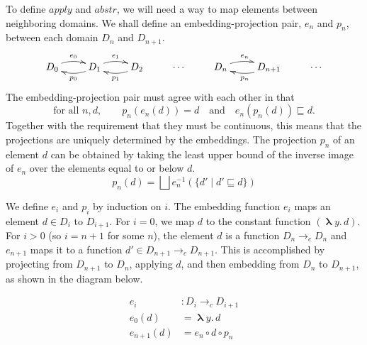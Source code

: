 \documentclass{tufte-handout}
\newcommand{\MLAM}[1]{\boldsymbol\uplambda #1.\,}
\begin{document}
To define $\mathit{apply}$ and $\mathit{abstr}$, we will need a way to
map elements between neighboring domains. We shall define an
embedding-projection pair, $e_n$ and $p_n$, between each domain $D_n$
and $D_{n+1}$.
\[
\xymatrix{
  D_0 \ar@/^/[r]^{e_0} & D_1 \ar@/^/[l]^{p_0} \ar@/^/[r]^{e_1} 
      & D_2 \ar@/^/[l]^{p_1} & \cdots &
  D_n \ar@/^/[r]^{e_n} & D_{n+1} \ar@/^/[l]^{p_n} & \cdots
}
\]
The embedding-projection pair must agree with each other in
that
\[
\text{for all } n, d, \qquad 
p_n(e_n(d)) = d \quad\text{and}\quad
e_n(p_n(d)) \sqsubseteq d.
\]
Together with the requirement that they must be continuous, this means
that the projections are uniquely determined by the embeddings.  The
projection $p_n$ of an element $d$ can be obtained by taking the least
upper bound of the inverse image of $e_n$ over the elements equal to
or below $d$.
\begin{equation}
   p_n(d) = \bigsqcup e^{-1}_n(\{ d' \mid d' \sqsubseteq d \})
   \label{eq:pn}
\end{equation}

We define $e_i$ and $p_i$ by induction on $i$. The embedding function
$e_i$ maps an element $d \in D_i$ to $D_{i+1}$.  For $i=0$, we map $d$
to the constant function $(\MLAM{y}d)$.  For $i > 0$ (so $i=n+1$ for
some $n$), the element $d$ is a function $D_n \to_c D_n$ and $e_{n+1}$
maps it to a function $d' \in D_{n+1} \to_c D_{n+1}$. This is
accomplished by projecting from $D_{n+1}$ to $D_n$, applying $d$, and
then embedding from $D_n$ to $D_{n+1}$, as shown in the diagram below.
\begin{center}
\begin{minipage}{0.5\textwidth}
\begin{align*}
  e_i &: D_i \to_c D_{i+1} \\
  e_0 (d) &= \MLAM{y} d \\
  e_{n+1}(d) &= e_n \circ d \circ p_n \\
\end{align*}
\end{minipage}
\begin{minipage}{0.5\textwidth}
\end{minipage} 
\end{center}
\end{document}
